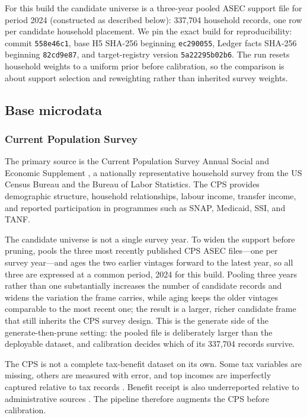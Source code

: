 For this build the candidate universe is a three-year pooled ASEC support file for period 2024
(constructed as described below): 337{,}704 household records, one row per candidate household placement.
We pin the exact build for
reproducibility: \microcosm{} commit \texttt{558e46c1}, base H5 SHA-256 beginning
\texttt{ec290055}, Ledger facts SHA-256 beginning \texttt{82cd9e87}, and target-registry version
\texttt{5a22295b02b6}. The run resets household weights to a uniform prior before calibration, so the
comparison is about support selection and reweighting rather than inherited survey weights.

\subsection{Base microdata}

\subsubsection{Current Population Survey}

The primary source is the Current Population Survey Annual Social and Economic Supplement
\citep[CPS ASEC;][]{census2024}, a nationally representative household survey from the US Census
Bureau and the Bureau of Labor Statistics. The CPS provides demographic structure, household
relationships, labour income, transfer income, and reported participation in programmes such as
SNAP, Medicaid, SSI, and TANF.

The candidate universe is not a single survey year. To widen the support before pruning, \microcosm{}
pools the three most recently published CPS ASEC files---one per survey year---and ages the two earlier
vintages forward to the latest year, so all three are expressed at a common period, 2024 for this build.
Pooling three years rather than one substantially increases the number of candidate records and widens the
variation the frame carries, while aging keeps the older vintages comparable to the most recent one; the result is a
larger, richer candidate frame that still inherits the CPS survey design. This is the generate side of the
generate-then-prune setting: the pooled file is deliberately larger than the deployable dataset, and
calibration decides which of its 337{,}704 records survive.

The CPS is not a complete tax-benefit dataset on its own. Some tax variables are missing, others are
measured with error, and top incomes are imperfectly captured relative to tax records
\citep{burkhauser2012}. Benefit receipt is also underreported relative to administrative sources
\citep{meyer2015}. The pipeline therefore augments the CPS before calibration.

